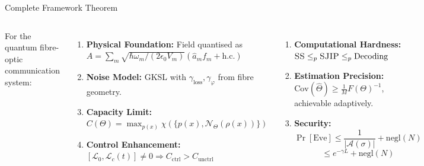 \documentclass[aspectratio=169,10pt]{beamer}
\begin{document}
\begin{frame}{Complete Framework Theorem}
  \begin{columns}[T]
      For the quantum fibre-optic communication system:
      \begin{enumerate}[leftmargin=*]
        \item[\textbf{(1)}] \textbf{Physical Foundation:}
          Field quantised as
          $\hat A=\sum_m\sqrt{\hbar\omega_m/(2\epsilon_0 V_m)}
          (\hat a_m f_m+\text{h.c.})$
        \item[\textbf{(2)}] \textbf{Noise Model:}
          GKSL with $\gamma_{\text{loss}},\gamma_\varphi$ from fibre
          geometry.
        \item[\textbf{(3)}] \textbf{Capacity Limit:}
          $C(\Theta)=\max_{p(x)}\chi(\{p(x),\mathcal{N}_\Theta(\rho(x))\})$
        \item[\textbf{(4)}] \textbf{Control Enhancement:}
          $[\mathcal{L}_0,\mathcal{L}_c(t)]\ne0\Rightarrow
          C_{\text{ctrl}}>C_{\text{unctrl}}$
      \end{enumerate}

      \begin{enumerate}[leftmargin=*]
        \item[\textbf{(5)}] \textbf{Computational Hardness:}
          $\textsc{SS}\le_p\textsc{SJIP}\le_p\text{Decoding}$
        \item[\textbf{(6)}] \textbf{Estimation Precision:}
          $\mathrm{Cov}(\hat\Theta)\ge\frac{1}{M}F(\Theta)^{-1}$,
          achievable adaptively.
        \item[\textbf{(7)}] \textbf{Security:}
          \[
            \Pr[\text{Eve}]\le
            \frac{1}{|\mathcal{A}(\sigma)|}+\mathrm{negl}(N)
          \]
          \[
            \le e^{-\gamma L}+\mathrm{negl}(N)
          \]
      \end{enumerate}
  \end{columns}
\end{frame}
\end{document}
